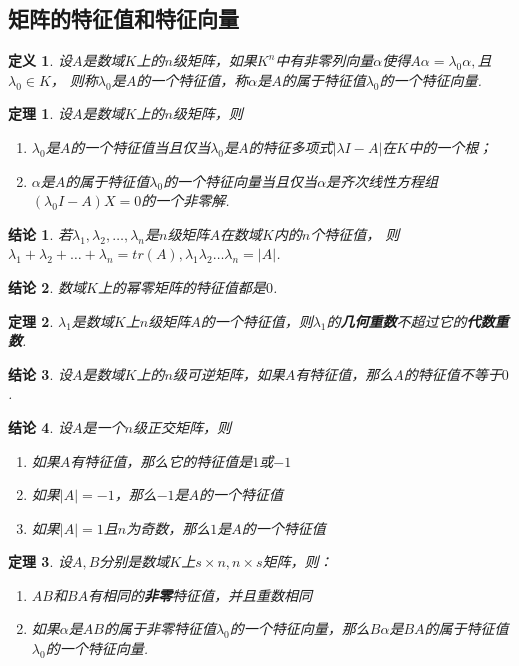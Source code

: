 \documentclass[UTF8]{article}
\newtheorem{thrm}{定理}[subsection]
\newtheorem{defn}{定义}[subsection]
\newtheorem{ccl}{结论}[subsection]
\begin{document}
\subsection{矩阵的特征值和特征向量}
\begin{defn}
  设$A$是数域$K$上的$n$级矩阵，如果$K^n$中有非零列向量$\alpha$使得$A\alpha=\lambda_0\alpha,$且$\lambda_0\in K$，
  则称$\lambda_0$是$A$的一个特征值，称$\alpha$是$A$的属于特征值$\lambda_0$的一个特征向量.
\end{defn}
\begin{thrm}
  设$A$是数域$K$上的$n$级矩阵，则
  \begin{enumerate}
    \item $\lambda_0$是$A$的一个特征值当且仅当$\lambda_0$是$A$的特征多项式$|\lambda I-A|$在$K$中的一个根；
    \item $\alpha$是$A$的属于特征值$\lambda_0$的一个特征向量当且仅当$\alpha$是齐次线性方程组$(\lambda_0I-A)X=0$的一个非零解.
  \end{enumerate}
\end{thrm}
\begin{ccl}
  若$\lambda_1,\lambda_2,\ldots,\lambda_n$是$n$级矩阵$A$在数域$K$内的$n$个特征值，
  则$\lambda_1+\lambda_2+\ldots+\lambda_n=tr(A),\lambda_1\lambda_2\ldots\lambda_n=|A|$.
\end{ccl}
\begin{ccl}
  数域$K$上的幂零矩阵的特征值都是$0$.
\end{ccl}
\begin{thrm}
  $\lambda_1$是数域$K$上$n$级矩阵$A$的一个特征值，则$\lambda_1$的\textbf{几何重数}不超过它的\textbf{代数重数}.
\end{thrm}
\begin{ccl}
  设$A$是数域$K$上的$n$级可逆矩阵，如果$A$有特征值，那么$A$的特征值不等于$0$.
\end{ccl}
\begin{ccl}
  设$A$是一个$n$级正交矩阵，则
  \begin{enumerate}
    \item 如果$A$有特征值，那么它的特征值是$1$或$-1$
    \item 如果$|A|=-1$，那么$-1$是$A$的一个特征值
    \item 如果$|A|=1$且$n$为奇数，那么$1$是$A$的一个特征值
  \end{enumerate}
\end{ccl}
\begin{thrm}
  设$A,B$分别是数域$K$上$s\times n,n\times s$矩阵，则：
  \begin{enumerate}
    \item $AB$和$BA$有相同的\textbf{非零}特征值，并且重数相同
    \item 如果$\alpha$是$AB$的属于非零特征值$\lambda_0$的一个特征向量，那么$B\alpha$是$BA$的属于特征值$\lambda_0$的一个特征向量.
  \end{enumerate}
\end{thrm}
\end{document}
